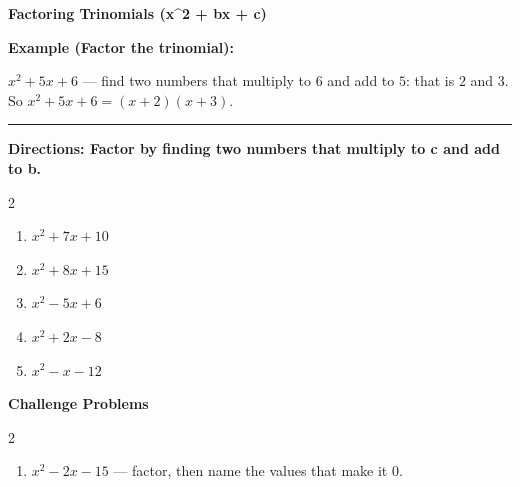 \documentclass[12pt]{article}
\begin{document}
\vspace{0.35cm}

\begin{center}{\Large \textbf{Factoring Trinomials (x\textasciicircum{}2 + bx + c)}}\end{center}\vspace{0.25cm}
\textbf{Example (Factor the trinomial):}

$x^{2}+5x+6$ — find two numbers that multiply to $6$ and add to $5$: that is $2$ and $3$. So $x^{2}+5x+6=(x+2)(x+3)$.

\vspace{0.3cm}\hrule\vspace{0.4cm}
\textbf{Directions: Factor by finding two numbers that multiply to c and add to b.}

\begin{multicols}{2}
\begin{enumerate}[label=\textbf{\arabic*.}, start=1, itemsep=2cm]
  \item $\displaystyle x^{2}+7x+10$
  \item $\displaystyle x^{2}+8x+15$
  \item $\displaystyle x^{2}-5x+6$
  \item $\displaystyle x^{2}+2x-8$
  \item $\displaystyle x^{2}-x-12$
\end{enumerate}
\end{multicols}
\newpage

\begin{center}{\large \textbf{Challenge Problems}}\end{center}\vspace{0.3cm}
\begin{multicols}{2}\begin{enumerate}[label=\textbf{\arabic*.}, start=6, itemsep=2.6cm]
  \item $x^{2}-2x-15$ — factor, then name the values that make it $0$.
\end{enumerate}\end{multicols}\newpage
\end{document}
